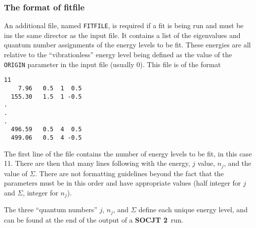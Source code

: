 \documentclass{article}
\newcommand{\socjttwo}{{\bf SOCJT 2}}
\begin{document}
\subsubsection{The format of fitfile} \label{section:fitting:file}

An additional file, named {\tt FITFILE}, is required if a fit is being run and must be ins the same director as the input file. It contains a list
of the eigenvalues and quantum number assignments of the energy levels to
be fit. These energies are all relative to the ``vibrationless''
energy level being defined as the value of the {\tt ORIGIN} parameter in the input file (usually 0). This file is of the format 
\begin{verbatim}
11
    7.96   0.5  1  0.5
  155.30   1.5  1 -0.5
.
.
.
  496.59   0.5  4  0.5
  499.06   0.5  4 -0.5  
\end{verbatim}
The first line of the file contains the number of energy levels to be
fit, in this case 11.  There are then that many lines following with
the energy, $j$ value, $n_j$, and the value of $\Sigma $.  There are not formatting guidelines beyond the fact that the parameters must be in this order and have appropriate values (half integer for $j$ and $\Sigma$, integer for $n_j$).

The three ``quantum numbers'' $j$,
$n_j$, and $\Sigma $ define each unique energy level, and can be found
at the end of the output of a \socjttwo\ run.




\end{document}
